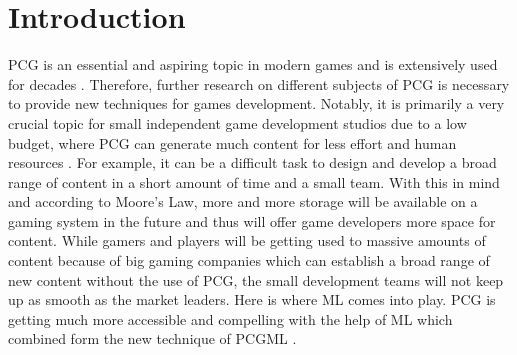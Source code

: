 \documentclass[MGS,Master,english]{twbook}%
\begin{document}
{{{    \newcommand{\citefigm}[2]{(Source: taken with modification from \protect\cite{#1}, p. #2)}%
    \newcommand{\citep}{\citeasnoun}%
    \newcommand{\acessedthrough}{Available at:}%
    \newcommand{\acessedthroughp}{Available through:}%
    \newcommand{\acessedat}{Accessed}%
    \newcommand{\singlepage}{p.}%
    \newcommand{\multiplepages}{pp.}%
    \newcommand{\chapternr}{Ch.}%
    \renewcommand{\harvardand}{\&}%
    \newcommand{\abstractonly}{Abstract only}
    \newcommand{\edition}{~edition}%
}}}

\maketitle

%
%
\chapter{Introduction}
\ac{PCG} is an essential and aspiring topic in modern games and is extensively used for decades \cite{pcg::whatIsPCG}. Therefore, further research on different subjects of \ac{PCG} is necessary to provide new techniques for games development. Notably, it is primarily a very crucial topic for small independent game development studios due to a low budget, where \ac{PCG} can generate much content for less effort and human resources \cite{pcg::shortHistoryOfDynamicAndPCG}. For example, it can be a difficult task to design and develop a broad range of content in a short amount of time and a small team. With this in mind and according to Moore’s Law, more and more storage will be available on a gaming system in the future and thus will offer game developers more space for content. While gamers and players will be getting used to massive amounts of content because of big gaming companies which can establish a broad range of new content without the use of PCG, the small development teams will not keep up as smooth as the market leaders. Here is where \ac{ML} comes into play. \ac{PCG} is getting much more accessible and compelling with the help of ML which combined form the new technique of \ac{PCGML} \cite{pcgml::paper}.
\end{document}
